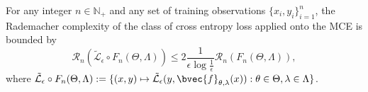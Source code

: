 \documentclass[runningheads, envcountsame, a4paper]{llncs}
\begin{document}
			\begin{lemma}
				\label{thm:rademacher_complexity_bound_with_cross_entropy_loss}
				For any integer $n \in \mathbb{N}_{+}$ and any set of training observations $\{x_{i}, y_{i}\}_{i = 1}^{n}$, the Rademacher complexity of the class of cross entropy loss applied onto the \gls{MCE} is bounded by
				\begin{equation}
					\mathcal{R}_{n}(\tilde{\mathcal{L}}_{\epsilon} \circ F_{n}(\Theta, \Lambda)) \leq 2 \frac{1}{\epsilon \log{\frac{1}{\epsilon}}} \mathcal{R}_{n}(F_{n}(\Theta, \Lambda)),
				\label{eq:composed_rademacher_complexity_bound}
				\end{equation}
				where $\tilde{\mathcal{L}}_{\epsilon} \circ F_{n}(\Theta, \Lambda) := \{(x, y) \mapsto \tilde{\mathcal{L}}_{\epsilon}(y, \bvec{f}_{\theta, \lambda}(x)) : \theta \in \Theta, \lambda \in \Lambda\}$.
			\end{lemma}
	
\end{document}
